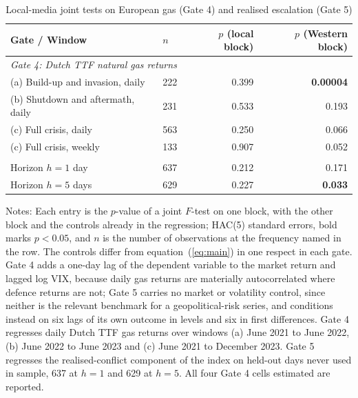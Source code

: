 \documentclass[12pt,a4paper]{article}
\newcommand{\compact}{\setlength{\tabcolsep}{3.5pt}\small}
\begin{document}
\begin{table}[htbp]
\centering
\caption{Local-media joint tests on European gas (Gate 4) and realised escalation (Gate 5)}
\label{tab:gates45}
\begin{threeparttable}
\compact
\begin{tabular}{llrr}
\toprule
Gate / Window & $n$ & $p$ (local block) & $p$ (Western block) \\
\midrule
\multicolumn{4}{l}{\textit{Gate 4: Dutch TTF natural gas returns}} \\
(a) Build-up and invasion, daily & 222 & 0.399 & \textbf{0.00004} \\
(b) Shutdown and aftermath, daily & 231 & 0.533 & 0.193 \\
(c) Full crisis, daily & 563 & 0.250 & 0.066 \\
(c) Full crisis, weekly & 133 & 0.907 & 0.052 \\
\addlinespace
\multicolumn{4}{l}{\textit{Gate 5: realised escalation (GPR\_ACT), held-out sample}} \\
Horizon $h=1$ day & 637 & 0.212 & 0.171 \\
Horizon $h=5$ days & 629 & 0.227 & \textbf{0.033} \\
\bottomrule
\end{tabular}
\begin{tablenotes}
\footnotesize
\item Notes: Each entry is the $p$-value of a joint $F$-test on one block, with
the other block and the controls already in the regression; HAC(5) standard
errors, bold marks $p<0.05$, and $n$ is the number of observations at the
frequency named in the row. The controls differ from equation~(\ref{eq:main})
in one respect in each gate. Gate 4 adds a one-day lag of the dependent
variable to the market return and lagged log VIX, because daily gas returns are
materially autocorrelated where defence returns are not; Gate 5 carries no
market or volatility control, since neither is the relevant benchmark for a
geopolitical-risk series, and conditions instead on six lags of its own outcome
in levels and six in first differences. Gate 4 regresses daily Dutch TTF gas returns over
windows (a) June 2021 to June 2022, (b) June 2022 to June 2023 and (c) June 2021
to December 2023. Gate 5 regresses the realised-conflict component of the
\citet{caldara2022} index on held-out days never used in sample, 637 at $h=1$
and 629 at $h=5$. All four Gate 4 cells estimated are reported.
\end{tablenotes}
\end{threeparttable}
\end{table}
\end{document}
